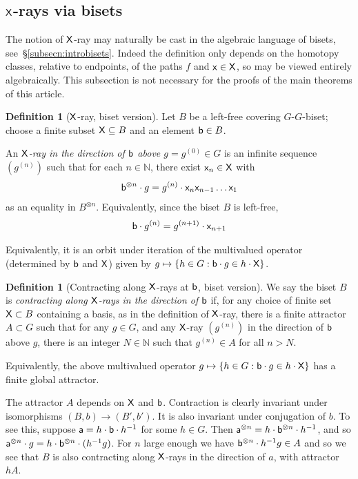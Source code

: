 \documentclass{amsart}
\newcommand\N{{\mathbb{N}}}
\theoremstyle{definition}
\newtheorem{defn}[thm]{Definition}
\theoremstyle{remark}
\newcommand{\sfX}{{\sf X}}
\newcommand{\sfx}{{\sf x}}
\newcommand{\sfb}{{\sf b}}
\newcommand{\sfa}{{\sf a}}
\begin{document}
\subsection{$\sfX$-rays via bisets}\label{subsec:basiscase}
The notion of $\sfX$-ray may naturally be cast in the algebraic language of bisets, see~\S\ref{subsecn:introbisets}. Indeed the definition only depends on the homotopy classes, relative to endpoints, of the paths $f$ and $\sfx\in \sfX$, so may be viewed entirely algebraically. This subsection is not necessary for the proofs of the main theorems of this article.

\begin{defn}[$\sfX$-ray, biset version]
  Let $B$ be a left-free covering $G$-$G$-biset; choose a finite subset $\sfX\subseteq B$ and an element $\sfb\in B$.

  An \emph{$\sfX$-ray in the direction of $\sfb$ above $g=g^{(0)}\in G$} is an infinite sequence $(g^{(n)})$ such that for each $n\in \N$, there exist $\sfx_n\in \sfX$ with 
\[ \sfb^{\otimes n} \cdot g = g^{(n)}\cdot \sfx_n\sfx_{n-1}\ldots \sfx_1\]
as an equality in $B^{\otimes n}$. Equivalently, since the biset $B$ is left-free,
\begin{equation}\label{eq:square}
\sfb \cdot g^{(n)}=g^{(n+1)}\cdot \sfx_{n+1}
\end{equation}
\end{defn}

Equivalently, it is an orbit under iteration of the multivalued operator (determined by $\sfb$ and $\sfX$) given by $g\mapsto\{h\in G: \sfb\cdot g\in h\cdot\sfX\}$.

\begin{defn}[Contracting along $\sfX$-rays at $\sfb$, biset version]
We say the biset $B$ is \emph{contracting along $\sfX$-rays in the direction of $\sfb$} if, for any choice of finite set $\sfX \subset B$ containing a basis, as in the definition of $\sfX$-ray, there is a finite attractor  $A\subset G$ such that for any $g\in G$, and any $\sfX$-ray $(g^{(n)})$ in the direction of $\sfb$ above $g$, there is an integer $N\in \N$ such that $g^{(n)}\in A$ for all $n>N$.
\end{defn}

Equivalently, the above multivalued operator $g \mapsto \{h\in G: \sfb\cdot g\in h\cdot\sfX\}$ has a finite global attractor.

The attractor $A$ depends on $\sfX$ and $\sfb$.  Contraction is clearly invariant under isomorphisms $(B,b)\to (B', b')$.  It is also invariant under conjugation of $b$.  To see this, suppose $\sfa=h\cdot \sfb\cdot h^{-1}$ for some $h\in G$.   Then  $\sfa^{\otimes n}=h \cdot \sfb^{\otimes n}\cdot h^{-1}$, and so $\sfa^{\otimes n}\cdot g=h\cdot \sfb^{\otimes n}\cdot (h^{-1}g)$.  For $n$ large enough we have $\sfb^{\otimes n}\cdot h^{-1}g\in A$ and so we see that $B$ is also contracting along $\sfX$-rays in the direction of $a$, with attractor $hA$.  
\end{document}
